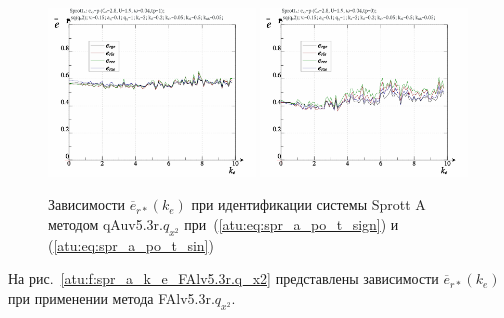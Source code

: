 \begin{figure}[h!]
  \centerline{
    \includegraphics[width=0.49\textwidth]{p/cha/spr_a/qAuv5.3r/sprott_a_qAuv5_3r_qx2-p_k_e_e_sign.png}
    \hfill
    \includegraphics[width=0.49\textwidth]{p/cha/spr_a/qAuv5.3r/sprott_a_qAuv5_3r_qx2-p_k_e_e_sin.png}
  }
  \caption{Зависимости $\overline{e}_{r*}(k_e)$ при идентификации системы Sprott A методом qAuv5.3r.$q_{x^2}$
   при~(\ref{atu:eq:spr_a_po_t_sign}) и (\ref{atu:eq:spr_a_po_t_sin})}
  \label{atu:f:spr_a_k_e_qAuv5.3r.q_x2}
\end{figure}

На рис.~\ref{atu:f:spr_a_k_e_FAlv5.3r.q_x2} представлены зависимости
$\overline{e}_{r*}(k_e)$ при применении метода FAlv5.3r.$q_{x^2}$.

